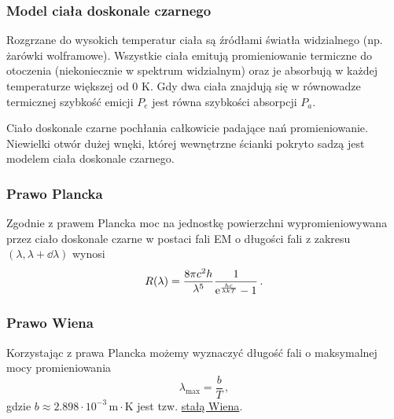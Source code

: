 \documentclass[../main.tex]{subfiles}
\begin{document}
\subsubsection*{Model ciała doskonale czarnego}
Rozgrzane do wysokich temperatur ciała są źródłami światła widzialnego (np. żarówki wolframowe).
Wszystkie ciała emitują promieniowanie termiczne do otoczenia (niekoniecznie w spektrum widzialnym)
oraz je absorbują w każdej temperaturze większej od 0 K. Gdy dwa ciała znajdują się w równowadze
termicznej szybkość emicji \(P_e\) jest równa szybkości absorpcji \(P_a\).
\medskip

Ciało doskonale czarne pochłania całkowicie padające nań promieniowanie. Niewielki otwór dużej
wnęki, której wewnętrzne ścianki pokryto sadzą jest modelem ciała doskonale czarnego.
\medskip

\noindent{}

\subsubsection*{Prawo Plancka}
Zgodnie z prawem Plancka moc na jednostkę powierzchni wypromieniowywana przez ciało doskonale czarne
w postaci fali EM o długości fali z zakresu \((\lambda, \lambda+\dd{\lambda})\) wynosi
\begin{equation*}
    R(\lambda)=\frac{8\pi c^2h}{\lambda^5}\frac{1}{\mathrm{e}^{\frac{hc}{\lambda kT}}-1}\,.
\end{equation*}
\subsubsection*{Prawo Wiena}
Korzystając z prawa Plancka możemy wyznaczyć długość fali o maksymalnej mocy promieniowania
\begin{equation*}
    \lambda_\text{max}=\frac{b}{T}\,,
\end{equation*}
gdzie \(b\approx2.898\cdot10^{-3}\,\text{m}\cdot\text{K}\) jest tzw. \underline{stałą Wiena}.
\end{document}
